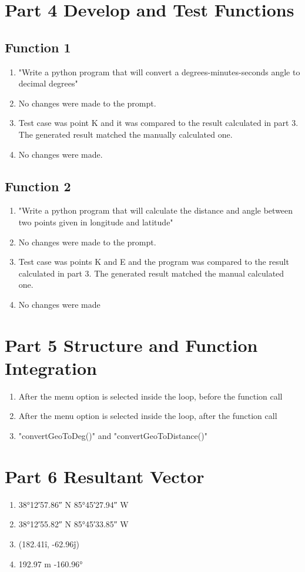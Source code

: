 \documentclass[11pt]{article}
\begin{document}
\section{Part 4 Develop and Test Functions}
\label{sec:orgfb75247}
\subsection{Function 1}
\label{sec:orgf96b592}
\begin{enumerate}
\item "Write a python program that will convert a degrees-minutes-seconds angle to
decimal degrees"
\item No changes were made to the prompt.
\item Test case was point K and it was compared to the result calculated in
part 3. The generated result matched the manually calculated one.
\item No changes were made.
\end{enumerate}

\subsection{Function 2}
\label{sec:org4038245}
\begin{enumerate}
\item "Write a python program that will calculate the distance and angle between
two points given in longitude and latitude"
\item No changes were made to the prompt.
\item Test case was points K and E and the program was compared to the result
calculated in part 3. The generated result matched the manual calculated one.
\item No changes were made
\end{enumerate}

\section{Part 5 Structure and Function Integration}
\label{sec:org3a9e8b4}
\begin{enumerate}
\item After the menu option is selected inside the loop, before the function call
\item After the menu option is selected inside the loop, after the function call
\item "convertGeoToDeg()" and "convertGeoToDistance()"
\end{enumerate}

\section{Part 6 Resultant Vector}
\label{sec:org825a378}
\begin{enumerate}
\item 38°12′57.86″ N 85°45′27.94″ W
\item 38°12′55.82″ N 85°45′33.85″ W
\item (182.41î, -62.96ĵ)
\item 192.97 m -160.96°
\end{enumerate}
\end{document}
